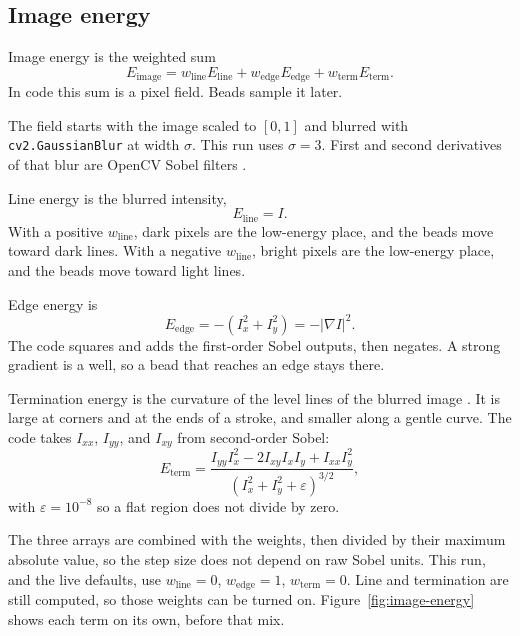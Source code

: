 \documentclass[11pt,twocolumn]{article}
\begin{document}
\subsection{Image energy}
\label{sec:image-energy}

Image energy is the weighted sum \cite{kass1988snakes}
\begin{equation}
  E_{\mathrm{image}}
    = w_{\mathrm{line}} E_{\mathrm{line}}
    + w_{\mathrm{edge}} E_{\mathrm{edge}}
    + w_{\mathrm{term}} E_{\mathrm{term}}.
\end{equation}
In code this sum is a pixel field. Beads sample it later.

The field starts with the image scaled to $[0,1]$ and blurred with \texttt{cv2.GaussianBlur} at width $\sigma$. This run uses $\sigma=3$. First and second derivatives of that blur are OpenCV Sobel filters \cite{bradski2000opencv}.

Line energy is the blurred intensity,
\begin{equation}
  E_{\mathrm{line}} = I.
\end{equation}
With a positive $w_{\mathrm{line}}$, dark pixels are the low-energy place, and the beads move toward dark lines. With a negative $w_{\mathrm{line}}$, bright pixels are the low-energy place, and the beads move toward light lines.

Edge energy is
\begin{equation}
  E_{\mathrm{edge}} = -(I_x^2 + I_y^2) = -|\nabla I|^2.
\end{equation}
The code squares and adds the first-order Sobel outputs, then negates. A strong gradient is a well, so a bead that reaches an edge stays there.

Termination energy is the curvature of the level lines of the blurred image \cite{kass1988snakes}. It is large at corners and at the ends of a stroke, and smaller along a gentle curve. The code takes $I_{xx}$, $I_{yy}$, and $I_{xy}$ from second-order Sobel:
\begin{equation}
  E_{\mathrm{term}}
    = \frac{I_{yy}I_x^2 - 2I_{xy}I_x I_y + I_{xx}I_y^2}
           {(I_x^2 + I_y^2 + \varepsilon)^{3/2}},
\end{equation}
with $\varepsilon = 10^{-8}$ so a flat region does not divide by zero.

The three arrays are combined with the weights, then divided by their maximum absolute value, so the step size does not depend on raw Sobel units. This run, and the live defaults, use $w_{\mathrm{line}}=0$, $w_{\mathrm{edge}}=1$, $w_{\mathrm{term}}=0$. Line and termination are still computed, so those weights can be turned on. Figure~\ref{fig:image-energy} shows each term on its own, before that mix.
\end{document}
